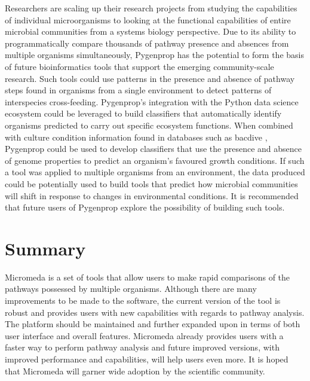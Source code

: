 Researchers are scaling up their research projects from studying the 
capabilities of individual microorganisms to looking at the functional 
capabilities of entire microbial communities from a systems biology perspective. 
Due to its ability to programmatically compare thousands of pathway presence and 
absences from multiple organisms simultaneously, Pygenprop has the potential to 
form the basis of future bioinformatics tools that support the emerging 
community-scale research. Such tools could use patterns in the presence and 
absence of pathway steps found in organisms from a single environment to detect 
patterns of interspecies cross-feeding. Pygenprop's integration with the Python 
data science ecosystem could be leveraged to build classifiers that 
automatically identify organisms predicted to carry out specific ecosystem 
functions. When combined with culture condition information found in databases 
such as \gls{bacdive} \cite{reimer2018bac}, Pygenprop could be used to develop 
classifiers that use the presence and absence of genome properties to predict an 
organism's favoured growth conditions. If such a tool was applied to multiple 
organisms from an environment, the data produced could be potentially used to 
build tools that predict how microbial communities will shift in response to 
changes in environmental conditions. It is recommended that future users of 
Pygenprop explore the possibility of building such tools.

\section{Summary}

Micromeda is a set of tools that allow users to make rapid comparisons of the 
pathways possessed by multiple organisms. Although there are many improvements 
to be made to the software, the current version of the tool is robust and 
provides users with new capabilities with regards to pathway analysis. The 
platform should be maintained and further expanded upon in terms of both user 
interface and overall features. Micromeda already provides users with a faster 
way to perform pathway analysis and future improved versions, with improved 
performance and capabilities, will help users even more. It is hoped that 
Micromeda will garner wide adoption by the scientific community.
